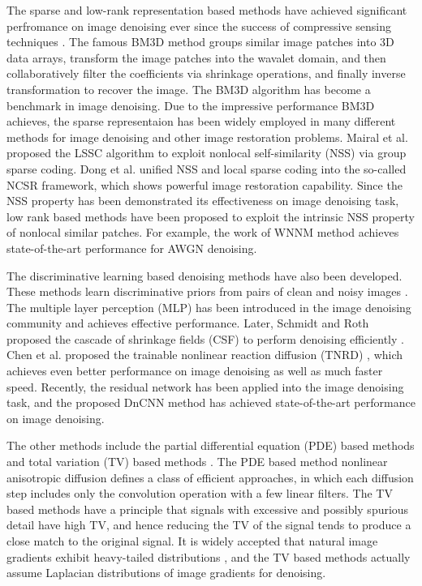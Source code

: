 The sparse and low-rank representation based methods have achieved significant perfromance on image denoising ever since the success of compressive sensing techniques \cite{csdonoho,candes2008introduction}. The famous BM3D \cite{bm3d} method groups similar image patches into 3D data arrays, transform the image patches into the wavalet domain, and then collaboratively filter the coefficients via shrinkage operations, and finally inverse transformation to recover the image. The BM3D algorithm has become a benchmark in image denoising. Due to the impressive performance BM3D achieves, the sparse representaion has been widely employed in many different methods \cite{lssc,ncsr} for image denoising and other image restoration problems. Mairal et al. \cite{lssc} proposed the LSSC algorithm to exploit nonlocal self-similarity (NSS) via group sparse coding. Dong et al. \cite{ncsr} unified NSS and local sparse coding into the so-called NCSR framework, which shows powerful image restoration capability. Since the NSS property has been demonstrated its effectiveness on image denoising task, low rank based methods \cite{nnm,wnnm} have been proposed to exploit the intrinsic NSS property of nonlocal similar patches. For example, the work of WNNM \cite{wnnm} method achieves state-of-the-art performance for AWGN denoising. 

The discriminative learning based denoising methods have also been developed. These methods learn discriminative priors from pairs of clean and noisy images \cite{mlp,csf,tnrd, dncnn}. The multiple layer perception (MLP) \cite{mlp} has been introduced in the image denoising community and achieves effective performance. Later, Schmidt and Roth proposed the cascade of shrinkage fields (CSF) to perform denoising efficiently \cite{csf}. Chen et al. proposed the trainable nonlinear reaction diffusion (TNRD) \cite{tnrd}, which achieves even better performance on image denoising as well as much faster speed. Recently, the residual network \cite{residualnetwork} has been applied into the image denoising task, and the proposed DnCNN method \cite{dncnn} has achieved state-of-the-art performance on image denoising.


The other methods include the partial differential equation (PDE) based methods \cite{PeronaMalik1990} and total variation (TV) based methods \cite{rudin1992nonlinear,osher2005iterative}. The PDE based method nonlinear anisotropic diffusion \cite{PeronaMalik1990} defines a class of efficient approaches, in which each diffusion step includes only the convolution operation with a few linear filters. The TV based methods \cite{rudin1992nonlinear,osher2005iterative} have a principle that signals with excessive and possibly spurious detail have high TV, and hence reducing the TV of the signal tends to produce a close match to the original signal. It is widely accepted that natural image gradients exhibit heavy-tailed distributions \cite{weiss}, and the TV based methods \cite{rudin1992nonlinear,osher2005iterative} actually assume Laplacian distributions of image gradients for denoising. 

